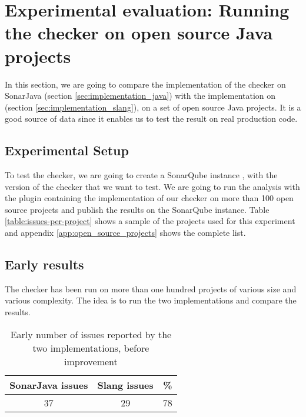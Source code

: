 \section{Experimental evaluation: \newline Running the checker on open source Java projects}
\label{sec:running_checker}

In this section, we are going to compare the implementation of the checker on SonarJava (section \ref{sec:implementation_java}) with the implementation on \slang{} (section \ref{sec:implementation_slang}), on a set of open source Java projects. 
It is a good source of data since it enables us to test the result on real production code.

\subsection{Experimental Setup}
\label{subsec:experimental_setup}

To test the checker, we are going to create a SonarQube instance \cite{SonarQube:2019:Online}, with the version of the checker that we want to test. We are going to run the analysis with the plugin containing the implementation of our checker on more than 100 open source projects and publish the results on the SonarQube instance. Table \ref{table:issues-per-project} shows a sample of the projects used for this experiment and appendix \ref{app:open_source_projects} shows the complete list.

\subsection{Early results}
\label{subsec:early_results}

The checker has been run on more than one hundred projects of various size and various complexity. 
The idea is to run the two implementations and compare the results.

\begin{table}[h]
	\centering
	\caption{Early number of issues reported by the two implementations, before improvement}
	\label{table:early-sonarjava-vs-slang}
	\begin{tabular}{|c|c|c|}
		\hline
		\bf SonarJava issues & \bf Slang issues & \bf \% \\ \hline
		37 &  29 &  78 \\ \hline
	\end{tabular}
\end{table}


